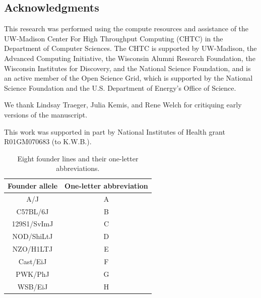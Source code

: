 \documentclass[12pt,twoside, lineno]{gsajnl}
\begin{document}
\subsection*{Acknowledgments}

This research was performed using the compute resources and assistance
of the UW-Madison Center For High Throughput Computing (CHTC) in the
Department of Computer Sciences. The CHTC is supported by UW-Madison,
the Advanced Computing Initiative, the Wisconsin Alumni Research
Foundation, the Wisconsin Institutes for Discovery, and the National
Science Foundation, and is an active member of the Open Science Grid,
which is supported by the National Science Foundation and the U.S.
Department of Energy's Office of Science.

We thank Lindsay Traeger, Julia Kemis, and Rene Welch for critiquing
early versions of the manuscript.

This work was supported in part by National Institutes of Health grant
R01GM070683 (to K.W.B.). 

\newpage
\appendix

\renewcommand{\thetable}{\textbf{S\arabic{table}}}
\setcounter{table}{0}


\begin{table}
  \caption{Eight founder lines and their one-letter abbreviations.}
  \label{table-letters}
\begin{center}
\small
  \begin{tabular}{ c | c }
    \hline
    Founder allele & One-letter abbreviation \\ \hline
    A/J & A \\
    C57BL/6J & B \\
    129S1/SvImJ & C \\
    NOD/ShiLtJ & D\\
    NZO/H1LTJ & E\\
    Cast/EiJ & F\\
    PWK/PhJ & G\\
    WSB/EiJ & H\\
    \hline
  \end{tabular}

\end{center}
  \end{table}

\clearpage
\end{document}
